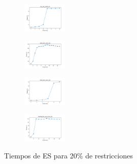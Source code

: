 \begin{figure}[H]
\begin{subfigure}
        \centering
        \includegraphics[width=0.234\textwidth]{img/es/iris_set_const_20_3773969821_time.png}
    \end{subfigure}
    \hfill
    \begin{subfigure}
        \centering
        \includegraphics[width=0.234\textwidth]{img/es/ecoli_set_const_20_3773969821_time.png}
    \end{subfigure}
    \hfill
    \begin{subfigure}
        \centering
        \includegraphics[width=0.234\textwidth]{img/es/rand_set_const_20_3773969821_time.png}
    \end{subfigure}
    \hfill
    \begin{subfigure}
        \centering
        \includegraphics[width=0.234\textwidth]{img/es/newthyroid_set_const_20_3773969821_time.png}
    \end{subfigure}
    \caption{Tiempos de ES para 20\% de restricciones}
\end{figure}

\vspace*{\fill}
\newpage
\vspace*{\fill}

